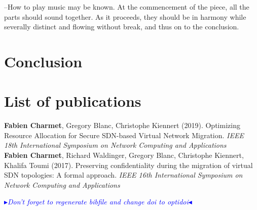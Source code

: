 \documentclass[a4paper, 11pt]{report}
\newcommand{\boxedtext}[1]{\fbox{\scriptsize\bfseries\textsf{#1}}}
\newcommand{\myremark}[2]{
   \textcolor{blue}{\boxedtext{#1}
      {\small$\blacktriangleright$\emph{\textsl{#2}}$\blacktriangleleft$}
}}
\newcommand\FC[1]{\myremark{FC}{#1}}
\theoremstyle{definition}
\begin{document}


\newpage


\newpage
\begin{savequote}
--How to play music may be known. At the commencement of the piece, all the parts should sound together. As it proceeds, they should be in harmony while severally distinct and flowing without break, and thus on to the conclusion.
\end{savequote}
\chapter{Conclusion}


\newpage
\chapter*{List of publications}
\textbf{Fabien Charmet}, Gregory Blanc, Christophe Kiennert (2019). Optimizing Resource Allocation for Secure SDN-based Virtual Network Migration. \textit{IEEE 18th International Symposium on Network Computing and Applications}\\

\textbf{Fabien Charmet}, Richard Waldinger, Gregory Blanc, Christophe Kiennert, Khalifa Toumi (2017). Preserving confidentiality during the migration of virtual SDN topologies: A formal approach. \textit{IEEE 16th International Symposium on Network Computing and Applications}

\newpage
\FC{Don't forget to regenerate bibfile and change doi to optidoi}
{}


% 
% 
\end{document}
